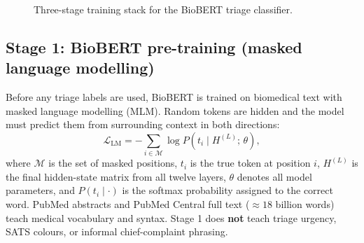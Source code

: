 \begin{figure}[H]
\centering
{}
\caption{Three-stage training stack for the BioBERT triage classifier.}
\label{fig:training-stages}
\end{figure}

\subsection{Stage 1: BioBERT pre-training (masked language modelling)}
\label{sec:mlm}

Before any triage labels are used, BioBERT is trained on biomedical text with masked language modelling (MLM). Random tokens are hidden and the model must predict them from surrounding context in both directions:
\begin{equation}
  \mathcal{L}_{\mathrm{LM}} = -\sum_{i \in \mathcal{M}} \log P(t_i \mid H^{(L)};\, \theta),
\end{equation}
where \(\mathcal{M}\) is the set of masked positions, \(t_i\) is the true token at position \(i\), \(H^{(L)}\) is the final hidden-state matrix from all twelve layers, \(\theta\) denotes all model parameters, and \(P(t_i \mid \cdot)\) is the softmax probability assigned to the correct word. PubMed abstracts and PubMed Central full text (\(\approx 18\) billion words) teach medical vocabulary and syntax. Stage 1 does \textbf{not} teach triage urgency, SATS colours, or informal chief-complaint phrasing.

